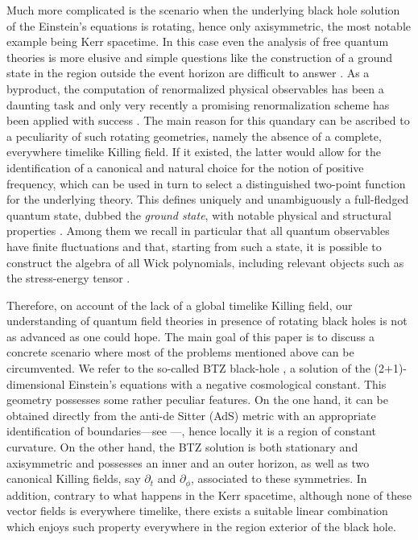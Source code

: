 \documentclass[aps, prd, amsmath, floats, floatfix, twocolumn, nofootinbib, superscriptaddress, showpacs]{revtex4-1}
\begin{document}
Much more complicated is the scenario when the underlying black hole
solution of the Einstein's equations is rotating, hence only
axisymmetric, the most notable example being Kerr spacetime. In this
case even the analysis of free quantum theories is more elusive and
simple questions like the construction of a ground state in the region
outside the event horizon are difficult to answer \cite{Kay:1988mu}. As
a byproduct, the computation of renormalized physical observables has
been a daunting task
\cite{Frolov:1982pi,Ottewill:2000qh,Duffy:2005mz,Ferreira:2014ina} and
only very recently a promising renormalization scheme has been applied
with success \cite{Levi:2015eea,Levi:2016exv}. The main reason for this
quandary can be ascribed to a peculiarity of such rotating geometries,
namely the absence of a complete, everywhere timelike Killing field. If
it existed, the latter would allow for the identification of a canonical
and natural choice for the notion of positive frequency, which can be
used in turn to select a distinguished two-point function for the
underlying theory. This defines uniquely and unambiguously a
full-fledged quantum state, dubbed the {\em ground state}, with notable
physical and structural properties \cite{Sahlmann:2000fh}. Among them we
recall in particular that all quantum observables have finite
fluctuations and that, starting from such a state, it is possible to
construct the algebra of all Wick polynomials, including relevant
objects such as the stress-energy tensor \cite{Khavkine:2014mta}.

Therefore, on account of the lack of a global timelike Killing field,
our understanding of quantum field theories in presence of rotating
black holes is not as advanced as one could hope. The main goal of this
paper is to discuss a concrete scenario where most of the problems
mentioned above can be circumvented. We refer to the so-called BTZ
black-hole \cite{Banados:1992wn,Banados:1992gq}, a solution of the
(2+1)-dimensional Einstein's equations with a negative cosmological
constant. This geometry possesses some rather peculiar features. On the
one hand, it can be obtained directly from the anti-de Sitter (AdS)
metric with an appropriate identification of boundaries---see
\cite{Banados:1992gq}---, hence locally it is a region of constant
curvature. On the other hand, the BTZ solution is both stationary and
axisymmetric and possesses an inner and an outer horizon, as well as two
canonical Killing fields, say $\partial_t$ and $\partial_\phi$,
associated to these symmetries. In addition, contrary to what happens
in the Kerr spacetime, although none of these vector fields is
everywhere timelike, there exists a suitable linear combination which
enjoys such property everywhere in the region exterior of the black hole.
\end{document}
